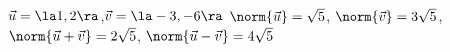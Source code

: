 {$\vec u=\la 1,2\ra$,\quad $\vec v = \la -3,-6\ra$
}
{$\norm{\vec u} = \sqrt{5}$, $\norm{\vec v} = 3\sqrt{5}$, $\norm{\vec u+\vec v} = 2\sqrt{5}$, $\norm{\vec u-\vec v} = 4\sqrt{5}$
}
